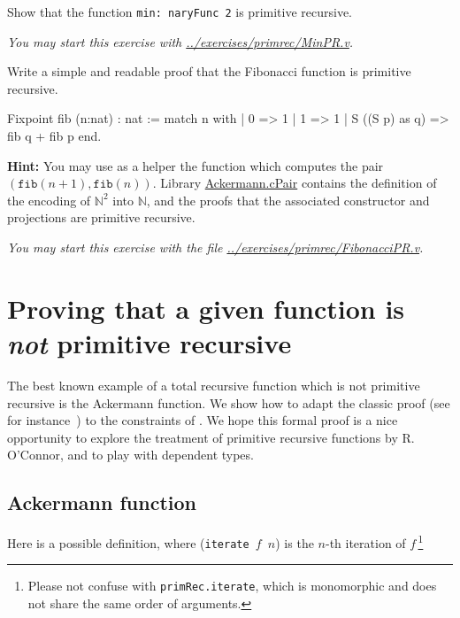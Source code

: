 \begin{exercise}
Show that the function \texttt{min: naryFunc\,2} is primitive
recursive.

\emph{You may start this exercise with
\url{../exercises/primrec/MinPR.v}.}

\end{exercise}


\begin{exercise}
Write a simple and readable proof that the Fibonacci function is primitive recursive.


\begin{Coqsrc}
Fixpoint fib (n:nat) : nat :=
  match n with
  | 0 => 1
  | 1 => 1
  | S ((S p) as q) => fib q + fib p
  end.
\end{Coqsrc}

\textbf{Hint:}  You may use as a helper the function which computes the pair 
$(\texttt{fib}(n+1),\texttt{fib}(n))$. 
Library \href{../theories/html/hydras.Ackermann.cPair.html}{Ackermann.cPair} contains
the definition of the encoding of $\mathbb{N}^2$ into $\mathbb{N}$, and the proofs that 
the associated constructor and projections are primitive recursive.


\emph{You may start this exercise with the file
\url{../exercises/primrec/FibonacciPR.v}.}

\end{exercise}



\section{Proving that a given function is \emph{not} primitive recursive}

The best known example of a total recursive function which is not primitive recursive is the Ackermann function. We show how to adapt the classic proof (see for instance~\cite{planetmath}) to the constraints of \gallina. We hope this formal proof 
 is a nice opportunity to explore
the treatment of primitive recursive functions by R. O'Connor,
and to play with dependent types.

\subsection{Ackermann function}

Here is a possible definition, where (\texttt{iterate\,$f$\,$n$})
is the $n$-th iteration of $f$\,\footnote{Please not confuse with \texttt{primRec.iterate}, which is monomorphic and does not share the same order of arguments.}

